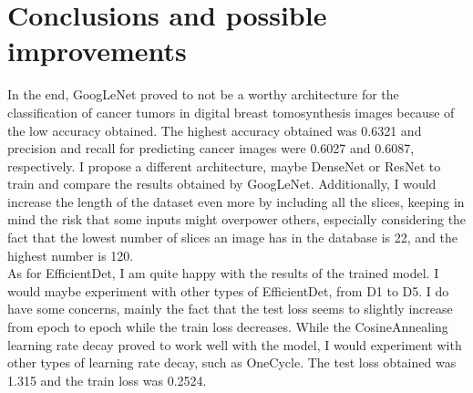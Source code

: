 \chapter{Conclusions and possible improvements}
In the end, GoogLeNet proved to not be a worthy architecture for the classification of cancer tumors in digital breast tomosynthesis images because of the low accuracy obtained. The highest accuracy obtained was 0.6321 and precision and recall for predicting cancer images were 0.6027 and 0.6087, respectively. I propose a different architecture, maybe DenseNet or ResNet to train and compare the results obtained by GoogLeNet. Additionally, I would increase the length of the dataset even more by including all the slices, keeping in mind the risk that some inputs might overpower others, especially considering the fact that the lowest number of slices an image has in the database is 22, and the highest number is 120.\\
As for EfficientDet, I am quite happy with the results of the trained model. I would maybe experiment with other types of EfficientDet, from D1 to D5. I do have some concerns, mainly the fact that the test loss seems to slightly increase from epoch to epoch while the train loss decreases. While the CosineAnnealing learning rate decay proved to work well with the model, I would experiment with other types of learning rate decay, such as OneCycle. The test loss obtained was 1.315 and the train loss was 0.2524.
